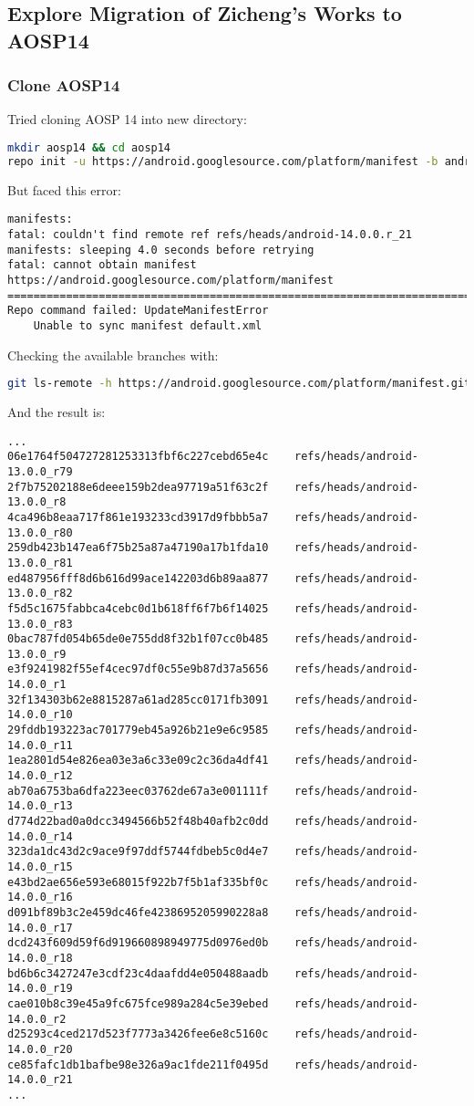 \subsection{Explore Migration of Zicheng's Works to AOSP14}
\label{task:20240116_aosp}

\subsubsection{Clone AOSP14}

Tried cloning AOSP 14 into new directory:
\begin{lstlisting}[language=bash]
mkdir aosp14 && cd aosp14
repo init -u https://android.googlesource.com/platform/manifest -b android-14.0.0.r_21
\end{lstlisting}
But faced this error:
\begin{lstlisting}
manifests:
fatal: couldn't find remote ref refs/heads/android-14.0.0.r_21
manifests: sleeping 4.0 seconds before retrying
fatal: cannot obtain manifest https://android.googlesource.com/platform/manifest
================================================================================
Repo command failed: UpdateManifestError
    Unable to sync manifest default.xml
\end{lstlisting}

Checking the available branches with:
\begin{lstlisting}[language=bash]
git ls-remote -h https://android.googlesource.com/platform/manifest.git
\end{lstlisting}
And the result is:
\begin{lstlisting}
...
06e1764f504727281253313fbf6c227cebd65e4c	refs/heads/android-13.0.0_r79
2f7b75202188e6deee159b2dea97719a51f63c2f	refs/heads/android-13.0.0_r8
4ca496b8eaa717f861e193233cd3917d9fbbb5a7	refs/heads/android-13.0.0_r80
259db423b147ea6f75b25a87a47190a17b1fda10	refs/heads/android-13.0.0_r81
ed487956fff8d6b616d99ace142203d6b89aa877	refs/heads/android-13.0.0_r82
f5d5c1675fabbca4cebc0d1b618ff6f7b6f14025	refs/heads/android-13.0.0_r83
0bac787fd054b65de0e755dd8f32b1f07cc0b485	refs/heads/android-13.0.0_r9
e3f9241982f55ef4cec97df0c55e9b87d37a5656	refs/heads/android-14.0.0_r1
32f134303b62e8815287a61ad285cc0171fb3091	refs/heads/android-14.0.0_r10
29fddb193223ac701779eb45a926b21e9e6c9585	refs/heads/android-14.0.0_r11
1ea2801d54e826ea03e3a6c33e09c2c36da4df41	refs/heads/android-14.0.0_r12
ab70a6753ba6dfa223eec03762de67a3e001111f	refs/heads/android-14.0.0_r13
d774d22bad0a0dcc3494566b52f48b40afb2c0dd	refs/heads/android-14.0.0_r14
323da1dc43d2c9ace9f97ddf5744fdbeb5c0d4e7	refs/heads/android-14.0.0_r15
e43bd2ae656e593e68015f922b7f5b1af335bf0c	refs/heads/android-14.0.0_r16
d091bf89b3c2e459dc46fe4238695205990228a8	refs/heads/android-14.0.0_r17
dcd243f609d59f6d919660898949775d0976ed0b	refs/heads/android-14.0.0_r18
bd6b6c3427247e3cdf23c4daafdd4e050488aadb	refs/heads/android-14.0.0_r19
cae010b8c39e45a9fc675fce989a284c5e39ebed	refs/heads/android-14.0.0_r2
d25293c4ced217d523f7773a3426fee6e8c5160c	refs/heads/android-14.0.0_r20
ce85fafc1db1bafbe98e326a9ac1fde211f0495d	refs/heads/android-14.0.0_r21
...
\end{lstlisting}

